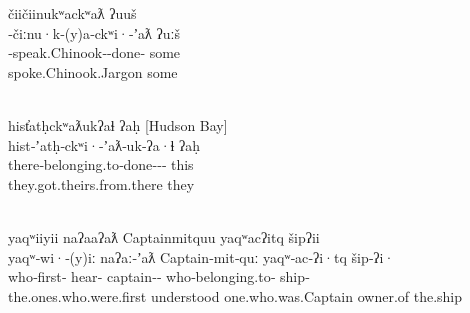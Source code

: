 \glllll čiičiinukʷackʷaƛ                                ʔuuš\\
        ‑čiːnu·k‑(y)a‑ckʷi·‑ʼaƛ                 ʔuːš\\
        ‑speak.Chinook‑‑done‑ some\\
        spoke.Chinook.Jargon                            some\\
                                               \\
        \vfix

\glllll hist̓atḥckʷaƛukʔaɬ                                  ʔaḥ      [Hudson Bay]\\
        hist‑ʼatḥ‑ckʷi·‑ʼaƛ‑uk‑ʔa·ɬ                        ʔaḥ      ~\\
        there‑belonging.to‑done‑‑‑ this     ~\\
        they.got.theirs.from.there                         they     ~\\
                                                   { }\\
        \vfix

\glllll yaqʷiiyii               naʔaaʔaƛ      Captainmitquu                 yaqʷacʔitq                  šipʔii\\
        yaqʷ‑wi·‑(y)iː          naʔaː‑ʼaƛ     Captain‑mit‑quː               yaqʷ‑ac‑ʔi·tq               šip‑ʔi·\\
        who‑first‑  hear‑ captain‑‑ who‑belonging.to‑ ship‑\\
        the.ones.who.were.first understood    one.who.was.Captain           owner.of                    the.ship\\
                                                                      \\
        \vfix

\renewcommand{\eachwordfour}{\rmfamily}

\parencite[Kingfisher]{Louie2003}
